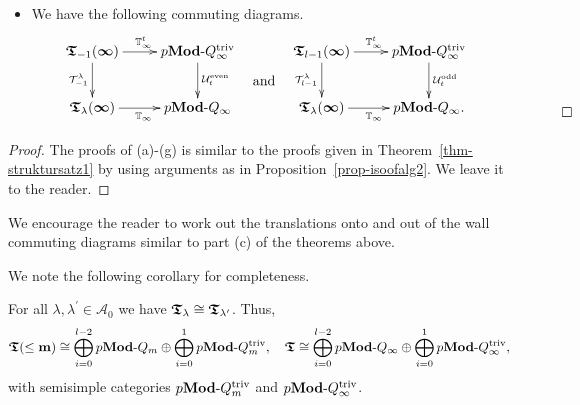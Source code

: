 \begin{thm}
\begin{itemize}
\[\begin{xy}
{      \T_{l-1}(\bbin) \ar[r]_/-0.1em/{\bVi^t}             &   \pModAtt.  
  }
\end{xy}
\]
\item[(g)] We have the following commuting diagrams.
\[
\begin{xy}
  \xymatrix{
      \T_{-1}(\bbin) \ar[r]^/-0.1em/{\bVi^t} \ar[d]_{\mathcal{T}^{\lambda}_{-1}}    &   \pModAtt \ar[d]^{\mathcal U^{\mathrm{even}}_t}  \\
      \T_{\lambda}(\bbin) \ar[r]_/-0.1em/{\bVi}             &   \pModAi  
  }
\end{xy}
\quad\raisebox{-0.75cm}{\text{and}}\quad
\begin{xy}
  \xymatrix{
      \T_{l-1}(\bbin) \ar[r]^/-0.1em/{\bVi^t} \ar[d]_{\mathcal{T}^{\lambda}_{l-1}}    &   \pModAtt \ar[d]^{\mathcal U^{\mathrm{odd}}_t}  \\
      \T_{\lambda}(\bbin) \ar[r]_/-0.1em/{\bVi}             &   \pModAi.  
  }
\end{xy}
\hspace{2.3cm}
\raisebox{-1.55cm}{\makeqed}
\hspace{-2.3cm}
\]
\end{itemize}
\end{thm}


\begin{proof}
The proofs of (a)-(g) is similar to 
the proofs given in Theorem~\ref{thm-struktursatz1} 
by using arguments as in Proposition~\ref{prop-isoofalg2}. We leave it to the reader.
\end{proof}



\begin{rem}\label{rem-othermaps}
We encourage the reader to work out the 
translations onto and out of the wall 
commuting diagrams similar to part (c) of the theorems above.
\end{rem}




We note the following corollary for completeness.
\begin{cor}\label{cor-struktursatz}
For all $\lambda,\lambda^{\prime}\in\mathcal A_0$ we have $\boldsymbol{\mathfrak{T}}_{\lambda}\cong \boldsymbol{\mathfrak{T}}_{\lambda^{\prime}}$. Thus,
\[
\boldsymbol{\mathfrak{T}}(\leq\boldsymbol{\mathrm{m}})\cong \bigoplus_{i=0}^{l-2}p\boldsymbol{\mathrm{Mod}}\text{-}Q_m\oplus\bigoplus_{i=0}^{1}p\boldsymbol{\mathrm{Mod}}\text{-}Q_m^{\mathrm{triv}},
\quad\boldsymbol{\mathfrak{T}}\cong \bigoplus_{i=0}^{l-2}p\boldsymbol{\mathrm{Mod}}\text{-}Q_{\infty}\oplus\bigoplus_{i=0}^{1}p\boldsymbol{\mathrm{Mod}}\text{-}Q_{\infty}^{\mathrm{triv}},
\]
with semisimple categories $p\boldsymbol{\mathrm{Mod}}\text{-}Q_m^{\mathrm{triv}}$ and $p\boldsymbol{\mathrm{Mod}}\text{-}Q_{\infty}^{\mathrm{triv}}$.\makeqed
\end{cor}



